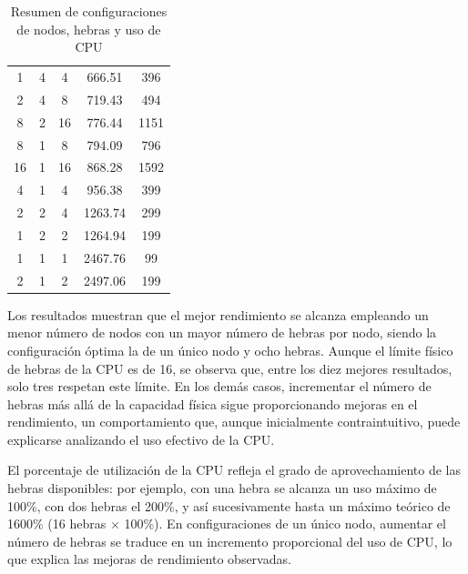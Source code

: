 \begin{table}[ht]
\begin{tabular}{|c|c|c|c|c|}
        1              & 4                 & 4                & 666.51          & 396               \\
        2              & 4                 & 8                & 719.43          & 494               \\
        8              & 2                 & 16               & 776.44          & 1151              \\
        8              & 1                 & 8                & 794.09          & 796               \\
        16             & 1                 & 16               & 868.28          & 1592              \\
        4              & 1                 & 4                & 956.38          & 399               \\
        2              & 2                 & 4                & 1263.74         & 299               \\
        1              & 2                 & 2                & 1264.94         & 199               \\
        1              & 1                 & 1                & 2467.76         & 99                \\
        2              & 1                 & 2                & 2497.06         & 199               \\
        \hline
    \end{tabular}
    \caption{Resumen de configuraciones de nodos, hebras y uso de CPU}
    \label{tab:summary_nodes_threads_cpu}
\end{table}

Los resultados muestran que el mejor rendimiento se alcanza empleando un menor número de nodos con un mayor número de hebras por nodo, siendo la configuración óptima la de un único nodo y ocho hebras. Aunque el límite físico de hebras de la CPU es de 16, se observa que, entre los diez mejores resultados, solo tres respetan este límite. En los demás casos, incrementar el número de hebras más allá de la capacidad física sigue proporcionando mejoras en el rendimiento, un comportamiento que, aunque inicialmente contraintuitivo, puede explicarse analizando el uso efectivo de la CPU.

El porcentaje de utilización de la CPU refleja el grado de aprovechamiento de las hebras disponibles: por ejemplo, con una hebra se alcanza un uso máximo de 100\%, con dos hebras el 200\%, y así sucesivamente hasta un máximo teórico de 1600\% (16 hebras $\times$ 100\%). En configuraciones de un único nodo, aumentar el número de hebras se traduce en un incremento proporcional del uso de CPU, lo que explica las mejoras de rendimiento observadas.

